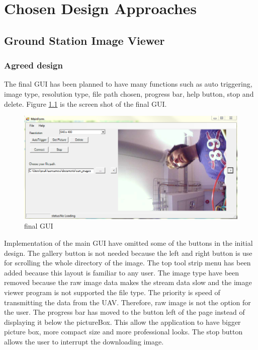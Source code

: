 \chapter{Chosen Design Approaches}




\section{Ground Station Image Viewer}
\subsection{Agreed design}

The final GUI has been planned to have many functions such as auto triggering, image type, resolution type, file path chosen, progress bar, help button, stop and delete. Figure \ref{finalGUI} is the screen shot of the final GUI.

\begin{figure}[!hbtp]
\begin{center}
\includegraphics[scale=0.5]{figures/finalGUI.png} 
\end{center}
\caption{final GUI\label{finalGUI}}
\end{figure}
Implementation of the main GUI have omitted some of the buttons in the initial design. The gallery button is not needed because the left and right button is use for scrolling the whole directory of the image. The top tool strip menu has been added because this layout is familiar to any user. The image type have been removed because the raw image data makes the stream data slow and the image viewer program is not supported the file type. The priority is speed of transmitting the data from the UAV. Therefore, raw image is not the option for the user. The progress bar has moved to the button left of the page instead of displaying it below the pictureBox.
This allow the application to have bigger picture box, more compact size and more professional looks.
The stop button allows the user to interrupt the downloading image.
